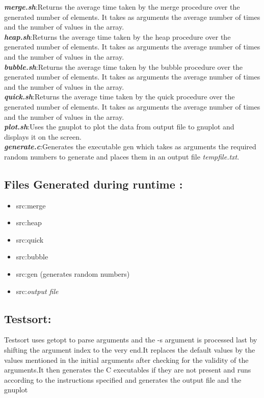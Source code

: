 \documentclass[a4paper,11pt]{article}
\begin{document}
\textbf{\emph{merge.sh}}:Returns the average time taken by the merge procedure over the generated number of elements. It takes as arguments the average number of times and the number of values in the array.\\
\textbf{\emph{heap.sh}}:Returns the average time taken by the heap procedure over the generated number of elements. It takes as arguments the average number of times and the number of values in the array.\\
\textbf{\emph{bubble.sh}}:Returns the average time taken by the bubble procedure over the generated number of elements. It takes as arguments the average number of times and the number of values in the array.\\
\textbf{\emph{quick.sh}}:Returns the average time taken by the quick procedure over the generated number of elements. It takes as arguments the average number of times and the number of values in the array.\\
\textbf{\emph{plot.sh}}:Uses the gnuplot to plot the data from output file to gnuplot and displays it on the screen.\\
\textbf{\emph{generate.c}}:Generates the executable gen which takes as arguments the required random numbers to generate and places them in an output file \emph{tempfile.txt}.\\
\subsection{Files Generated during runtime :}
\begin{itemize}
\item src:merge
\item src:heap
\item src:quick
\item src:bubble
\item src:gen (generates random numbers)
\item src:\emph{output file}
\end{itemize}
\subsection{Testsort:}Testsort uses getopt to parse arguments and the -s argument is processed last by shifting the argument index to the very end.It replaces the default values by the values mentioned in the initial arguments after checking for the validity of the arguments.It then generates the C executables if they are not present and runs according to the instructions specified and generates the output file and the gnuplot
\newpage
\end{document}
